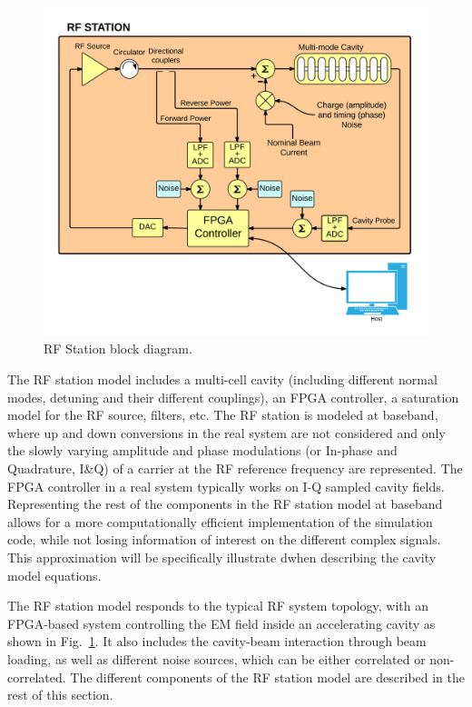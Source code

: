 \documentclass[a4paper,12pt]{article}
\begin{document}
\begin{figure}
\centering
\includegraphics[scale=0.75]{../figures/Station_rf_blocks.png}
\caption{RF Station block diagram.}
\label{fig:Station_block_diagram}
\end{figure}

The RF station model includes a multi-cell cavity (including different normal modes, detuning and their different couplings), an FPGA controller, a saturation model for the RF source, filters, etc. The RF station is modeled at baseband, where up and down conversions in the real system are not considered and only the slowly varying amplitude and phase modulations (or In-phase and Quadrature, I\&Q) of a carrier at the RF reference frequency are represented. The FPGA controller in a real system typically works on I-Q sampled cavity fields. Representing the rest of the components in the RF station model at baseband allows for a more computationally efficient implementation of the simulation code, while not losing information of interest on the different complex signals. This approximation will be specifically illustrate dwhen describing the cavity model equations.

The RF station model responds to the typical RF system topology, with an FPGA-based system controlling the EM field inside an accelerating cavity as shown in Fig.~\ref{fig:Station_block_diagram}. It also includes the cavity-beam interaction through beam loading, as well as different noise sources, which can be either correlated or non-correlated. The different components of the RF station model are described in the rest of this section.
\end{document}
